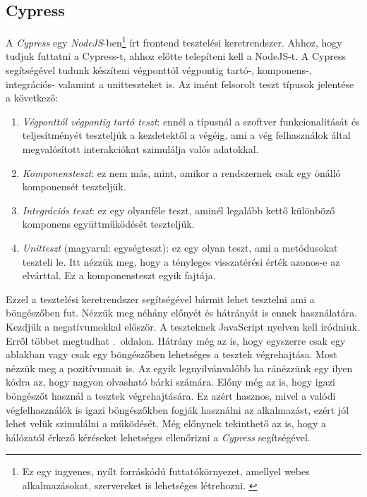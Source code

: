 \documentclass[]{thesis-ekf}
\theoremstyle{definition}
\theoremstyle{remark}
\begin{document}
	\subsection{Cypress}
		A \emph{Cypress} egy \emph{NodeJS}-ben\footnote{Ez egy ingyenes, nyílt forráskódú futtatókörnyezet, amellyel webes alkalmazásokat, szervereket is lehetséges létrehozni. \cite{NodeJS}} írt frontend tesztelési keretrendszer. Ahhoz, hogy tudjuk futtatni a Cypress-t, ahhoz előtte telepíteni kell a NodeJS-t. A Cypress segítségével tudunk készíteni végponttól végpontig tartó-, komponens-, integrációs- valamint a unitteszteket is.
		Az imént felsorolt teszt típusok jelentése a következő:
		\begin{enumerate}
			\item \emph{Végponttól végpontig tartó teszt}: ennél a típusnál a szoftver funkcionalitását és teljesítményét teszteljük a kezdetektől a végéig, ami a vég felhasználok által megvalósított interakciókat szimulálja valós adatokkal.
			\item \emph{Komponensteszt}: ez nem más, mint, amikor a rendszernek csak egy önálló komponensét teszteljük.
			\item \emph{Integrációs teszt}: ez egy olyanféle teszt, aminél legalább kettő különböző komponens együttműködését teszteljük.
			\item \emph{Unitteszt} (magyarul: egységteszt): ez egy olyan teszt, ami a metódusokat teszteli le. Itt nézzük meg, hogy a tényleges visszatérési érték azonos-e az elvárttal. Ez a komponensteszt egyik fajtája.
		\end{enumerate}
		Ezzel a tesztelési keretrendszer segítségével bármit lehet tesztelni ami a böngészőben fut. Nézzük meg néhány előnyét és hátrányát is ennek használatára. Kezdjük a negatívumokkal először. A teszteknek JavaScript nyelven kell íródniuk. Erről többet megtudhat \az{\pageref{javascript}}.~oldalon. Hátrány még az is, hogy egyszerre csak egy ablakban vagy csak egy böngészőben lehetséges a tesztek végrehajtása. Most nézzük meg a pozitívumait is. Az egyik legnyilvánvalóbb ha ránézzünk egy ilyen kódra az, hogy nagyon olvasható bárki számára. Előny még az is, hogy igazi böngészőt használ a tesztek végrehajtására. Ez azért hasznos, mivel a valódi végfelhasználók is igazi böngészőkben fogják használni az alkalmazást, ezért jól lehet velük szimulálni a működését. Még előnynek tekinthető az is, hogy a hálózatól érkező kéréseket lehetséges ellenőrizni a \emph{Cypress} segítségével.
		\cite{Kusper Szoftvertesztles, Cypress, Katalon, Medium}
		
\end{document}
